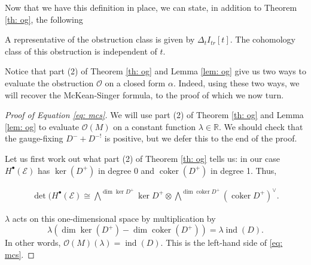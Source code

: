\documentclass[11pt]{amsart}
\newcommand{\E}{\mscr{E}}
\newcommand{\mscr}{\mathscr}
\newcommand{\mbb}{\mathbb}
\newcommand{\R}{\mbb R}
\numberwithin{equation}{section}
\newcommand\ind{\operatorname{ind}}
\newcommand\coker{\operatorname{coker}}
\begin{document}
Now that we have this definition in place, we can state, in addition to Theorem \ref{th: og}, the following
\begin{lemma}
	\label{lem: og}
	A representative of the obstruction class is given by $\Delta_tI_{tr}[t]$. The cohomology class of this obstruction is independent of $t$.
\end{lemma}

Notice that part (2) of Theorem \ref{th: og} and Lemma \ref{lem: og} give us two ways to evaluate the obstruction $\mathcal O$ on a closed form $\alpha$. Indeed, using these two ways, we will recover the McKean-Singer formula, to the proof of which we now turn.

\begin{proof}[Proof of Equation \ref{eq: mcs}]
We will use part (2) of Theorem \ref{th: og} and Lemma \ref{lem: og} to evaluate $\mathcal O(M)$ on a constant function $\lambda\in \R$. We should check that the gauge-fixing $D^-+D^{-!}$ is positive, but we defer this to the end of the proof.

Let us first work out what part (2) of Theorem \ref{th: og} tells us: in our case $H^\bullet(\E)$ has $\ker(D^+)$ in degree 0 and $\coker(D^+)$ in degree 1. Thus,

\begin{align*}
\det(H^\bullet(\E)\cong \bigwedge^{\dim\ker D^+}\ker D^+ \otimes \bigwedge^{\dim \coker D^+}(\coker D^+)^\vee.
\end{align*}

$\lambda$ acts on this one-dimensional space by multiplication by
\[
\lambda\left(\dim\ker(D^+)-\dim\coker(D^+)\right)=\lambda \ind (D).
\]
In other words, $\mathcal O(M)(\lambda) = \ind(D)$. This is the left-hand side of \ref{eq: mcs}.


\end{proof}
\end{document}
